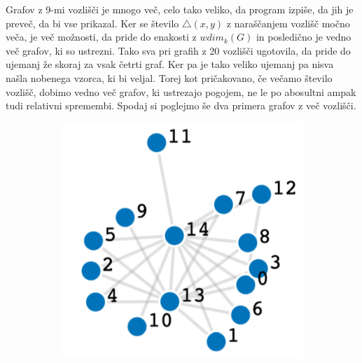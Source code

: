 \documentclass[12pt,a4paper]{amsart}
\theoremstyle{plain} %
\begin{document}
Grafov z 9-mi vozlišči je mnogo več, celo tako veliko,
da program izpiše, da jih je preveč, da bi vse prikazal. Ker se število $\triangle(x,y)$ z naraščanjem vozlišč močno veča,
je več možnosti, da pride do enakosti z $wdim_k(G)$ in posledično je vedno več grafov, ki so ustrezni. Tako sva pri grafih z 
20 vozlišči ugotovila, da pride do ujemanj že skoraj za vsak četrti graf. Ker pa je tako veliko ujemanj pa nisva našla nobenega vzorca, 
ki bi veljal. 
Torej kot pričakovano, če večamo število vozlišč, dobimo vedno več grafov, ki ustrezajo pogojem, ne le po abosultni 
ampak tudi relativni spremembi. Spodaj si poglejmo še dva primera grafov z več vozlišči. 
\bigskip

\bigskip

\bigskip
\begin{figure}[h]
    \centering
    \begin{subfigure}{0.25\textwidth}
    \centering
    \includegraphics[width = \textwidth]{slike/graf15.png}
    \end{subfigure}
    \begin{subfigure}{0.25\textwidth}
    \centering

\end{subfigure}
\end{figure}
\end{document}
